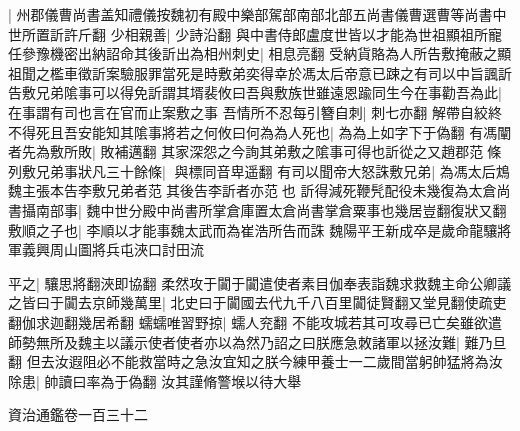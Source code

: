 |{
	州郡儀曹尚書盖知禮儀按魏初有殿中樂部駕部南部北部五尚書儀曹選曹等尚書中世所置訢許斤翻}
少相親善|{
	少詩沿翻}
與中書侍郎盧度世皆以才能為世祖顯祖所寵任參豫機密出納詔命其後訢出為相州刺史|{
	相息亮翻}
受納貨賂為人所告敷掩蔽之顯祖聞之檻車徵訢案驗服罪當死是時敷弟奕得幸於馮太后帝意已踈之有司以中旨諷訢告敷兄弟隂事可以得免訢謂其壻裴攸曰吾與敷族世雖遠恩踰同生今在事勸吾為此|{
	在事謂有司也言在官而止案敷之事}
吾情所不忍每引簪自刺|{
	刺七亦翻}
解帶自絞終不得死且吾安能知其隂事將若之何攸曰何為為人死也|{
	為為上如字下于偽翻}
有馮闡者先為敷所敗|{
	敗補邁翻}
其家深怨之今詢其弟敷之隂事可得也訢從之又趙郡范條列敷兄弟事狀凡三十餘條|{
	與標同音卑遥翻}
有司以聞帝大怒誅敷兄弟|{
	為馮太后鴆魏主張本告李敷兄弟者范其後告李訢者亦范也}
訢得減死鞭髠配役未幾復為太倉尚書攝南部事|{
	魏中世分殿中尚書所掌倉庫置太倉尚書掌倉粟事也幾居豈翻復狀又翻}
敷順之子也|{
	李順以才能事魏太武而為崔浩所告而誅}
魏陽平王新成卒是歲命龍驤將軍義興周山圖將兵屯浹口討田流

平之|{
	驤思將翻浹即協翻}
柔然攻于闐于闐遣使者素目伽奉表詣魏求救魏主命公卿議之皆曰于闐去京師幾萬里|{
	北史曰于闐國去代九千八百里闐徒賢翻又堂見翻使疏吏翻伽求迦翻幾居希翻}
蠕蠕唯習野掠|{
	蠕人兖翻}
不能攻城若其可攻尋已亡矣雖欲遣師勢無所及魏主以議示使者使者亦以為然乃詔之曰朕應急敇諸軍以拯汝難|{
	難乃旦翻}
但去汝遐阻必不能救當時之急汝宜知之朕今練甲養士一二歲間當躬帥猛將為汝除患|{
	帥讀曰率為于偽翻}
汝其謹脩警堠以待大舉

資治通鑑卷一百三十二
